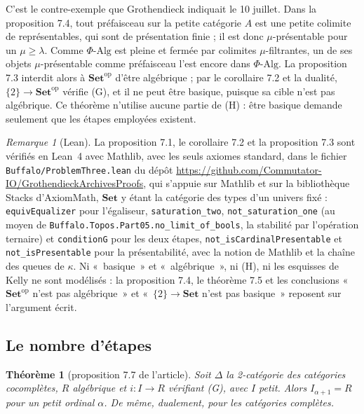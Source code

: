 \documentclass[11pt,a4paper]{amsart}
\theoremstyle{definition}
\theoremstyle{plain}
\newtheorem{theoreme}{Théorème}
\theoremstyle{remark}
\newtheorem{remarque}{Remarque}
\newcommand{\Set}{\mathbf{Set}}
\begin{document}
C'est le contre-exemple que Grothendieck indiquait le 10 juillet. Dans la proposition 7.4, tout préfaisceau sur la petite catégorie $A$ est une petite colimite de représentables, qui sont de présentation finie ; il est donc $\mu$-présentable pour un $\mu\ge\lambda$. Comme $\Phi\text{-}\mathrm{Alg}$ est pleine et fermée par colimites $\mu$-filtrantes, un de ses objets $\mu$-présentable comme préfaisceau l'est encore dans $\Phi\text{-}\mathrm{Alg}$. La proposition 7.3 interdit alors à $\Set^{\mathrm{op}}$ d'être algébrique ; par le corollaire 7.2 et la dualité, $\{2\}\to\Set^{\mathrm{op}}$ vérifie (G), et il ne peut être basique, puisque sa cible n'est pas algébrique. Ce théorème n'utilise aucune partie de (H) : être basique demande seulement que les étapes employées existent.

\begin{remarque}[Lean]\sloppy
La proposition 7.1, le corollaire 7.2 et la proposition 7.3 sont vérifiés en Lean~4 avec Mathlib, avec les seuls axiomes standard, dans le fichier \texttt{Buffalo/\allowbreak ProblemThree.lean} du dépôt \url{https://github.com/Commutator-IO/GrothendieckArchivesProofs}, qui s'appuie sur Mathlib et sur la bibliothèque Stacks d'AxiomMath, $\Set$ y étant la catégorie des types d'un univers fixé : \texttt{equivEqualizer} pour l'égaliseur, \texttt{saturation\_two}, \texttt{not\_saturation\_one} (au moyen de \texttt{Buffalo.\allowbreak Topos.\allowbreak Part05.\allowbreak no\_limit\_of\_bools}, la stabilité par l'opération ternaire) et \texttt{conditionG} pour les deux étapes, \texttt{not\_isCardinalPresentable} et \texttt{not\_isPresentable} pour la présentabilité, avec la notion de Mathlib et la chaîne des queues de $\kappa$. Ni «~basique~» et «~algébrique~», ni (H), ni les esquisses de Kelly ne sont modélisés : la proposition 7.4, le théorème 7.5 et les conclusions «~$\Set^{\mathrm{op}}$ n'est pas algébrique~» et «~$\{2\}\to\Set$ n'est pas basique~» reposent sur l'argument écrit.
\end{remarque}

\subsection{Le nombre d'étapes}

\begin{theoreme}[proposition 7.7 de l'article]
Soit $\Delta$ la 2-catégorie des catégories cocomplètes, $R$ algébrique et $i\colon I\to R$ vérifiant (G), avec $I$ petit. Alors $I_{\alpha+1}=R$ pour un petit ordinal $\alpha$. De même, dualement, pour les catégories complètes.
\end{theoreme}
\end{document}
